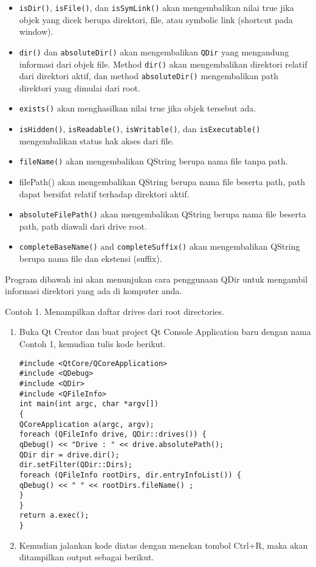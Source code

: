 \begin{itemize}
\tightlist
\item
  \texttt{isDir()}, \texttt{isFile()}, dan \texttt{isSymLink()} akan
  mengembalikan nilai true jika objek yang dicek berupa direktori, file,
  atau symbolic link (shortcut pada window).
\item
  \texttt{dir()} dan \texttt{absoluteDir()} akan mengembalikan
  \texttt{QDir} yang mengandung informasi dari objek file. Method
  \texttt{dir()} akan mengembalikan direktori relatif dari direktori
  aktif, dan method \texttt{absoluteDir()} mengembalikan path direktori
  yang dimulai dari root.
\item
  \texttt{exists()} akan menghasilkan nilai true jika objek tersebut
  ada.
\item
  \texttt{isHidden()}, \texttt{isReadable()}, \texttt{isWritable()}, dan
  \texttt{isExecutable()} mengembalikan status hak akses dari file.
\item
  \texttt{fileName()} akan mengembalikan QString berupa nama file tanpa
  path.
\item
  filePath() akan mengembalikan QString berupa nama file beserta path,
  path dapat bersifat relatif terhadap direktori aktif.
\item
  \texttt{absoluteFilePath()} akan mengembalikan QString berupa nama
  file beserta path, path diawali dari drive root.
\item
  \texttt{completeBaseName()} and \texttt{completeSuffix()} akan
  mengembalikan QString berupa nama file dan ekstensi (suffix).
\end{itemize}

Program dibawah ini akan menunjukan cara penggunaan QDir untuk mengambil
informasi direktori yang ada di komputer anda.

Contoh 1. Menampilkan daftar drives dari root directories.

\begin{enumerate}
\def\labelenumi{\arabic{enumi}.}
\item
  Buka Qt Creator dan buat project Qt Console Application baru dengan
  nama Contoh 1, kemudian tulis kode berikut.

\begin{verbatim}
#include <QtCore/QCoreApplication>
#include <QDebug>
#include <QDir>
#include <QFileInfo>
int main(int argc, char *argv[])
{
QCoreApplication a(argc, argv);
foreach (QFileInfo drive, QDir::drives()) {
qDebug() << "Drive : " << drive.absolutePath();
QDir dir = drive.dir();
dir.setFilter(QDir::Dirs);
foreach (QFileInfo rootDirs, dir.entryInfoList()) {
qDebug() << " " << rootDirs.fileName() ;
}
}
return a.exec();
}
\end{verbatim}
\item
  Kemudian jalankan kode diatas dengan menekan tombol Ctrl+R, maka akan
  ditampilkan output sebagai berikut.
\end{enumerate}

